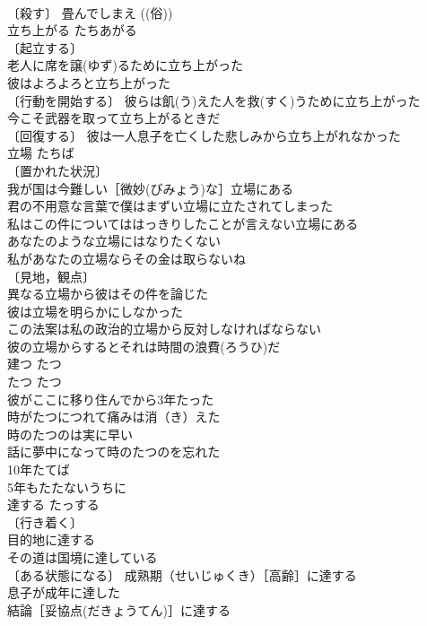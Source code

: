 \documentclass[8pt]{extreport}
\begin{document}
\begin{CJK}{UTF8}{min}
\\	〔殺す〕 畳んでしまえ ((俗))
\\	立ち上がる	たちあがる	
\\	〔起立する〕
\\	老人に席を譲(ゆず)るために立ち上がった 
\\	彼はよろよろと立ち上がった 
\\	〔行動を開始する〕 彼らは飢(う)えた人を救(すく)うために立ち上がった 
\\	今こそ武器を取って立ち上がるときだ 
\\	〔回復する〕 彼は一人息子を亡くした悲しみから立ち上がれなかった 
\\	立場	たちば	
\\	〔置かれた状況〕
\\	我が国は今難しい［微妙(びみょう)な］立場にある 
\\	君の不用意な言葉で僕はまずい立場に立たされてしまった 
\\	私はこの件についてははっきりしたことが言えない立場にある 
\\	あなたのような立場にはなりたくない 
\\	私があなたの立場ならその金は取らないね 
\\	〔見地，観点〕
\\	異なる立場から彼はその件を論じた 
\\	彼は立場を明らかにしなかった 
\\	この法案は私の政治的立場から反対しなければならない 
\\	彼の立場からするとそれは時間の浪費(ろうひ)だ 
\\	建つ	たつ	
\\	たつ	たつ	
\\	彼がここに移り住んでから3年たった 
\\	時がたつにつれて痛みは消（き）えた 
\\	時のたつのは実に早い 
\\	話に夢中になって時のたつのを忘れた 
\\	10年たてば 
\\	5年もたたないうちに 
\\	達する	たっする	
\\	〔行き着く〕
\\	目的地に達する 
\\	その道は国境に達している 
\\	〔ある状態になる〕 成熟期（せいじゅくき）［高齢］に達する 
\\	息子が成年に達した 
\\	結論［妥協点(だきょうてん)］に達する 

\end{CJK}
\end{document}
